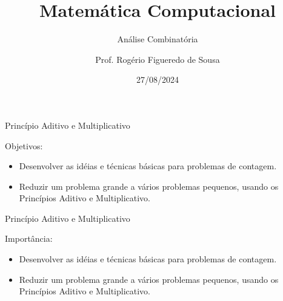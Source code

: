 \documentclass[aspectratio=169]{beamer}
\title{Matemática Computacional}
\subtitle{Análise Combinatória}
\author{Prof. Rogério Figueredo de Sousa}
\institute{%
\href{rogerio.sousa@ifpi.edu.br}{rogerio.sousa@ifpi.edu.br}%
}%
\date{27/08/2024}
\begin{document}
\begin{frame}[plain]
    \titlepage
\end{frame}




\jsonp
{}

\begin{frame}{Princípio Aditivo e Multiplicativo}

    Objetivos:

    \begin{itemize}
        \item Desenvolver as idéias e técnicas básicas para problemas de contagem.
        \item Reduzir um problema grande a vários problemas pequenos, usando os Princípios Aditivo e Multiplicativo.
    \end{itemize}

\end{frame}

\begin{frame}{Princípio Aditivo e Multiplicativo}

    Importância:

    \begin{itemize}
        \item Desenvolver as idéias e técnicas básicas para problemas de contagem.
        \item Reduzir um problema grande a vários problemas pequenos, usando os Princípios Aditivo e Multiplicativo.
    \end{itemize}

\end{frame}
\end{document}
